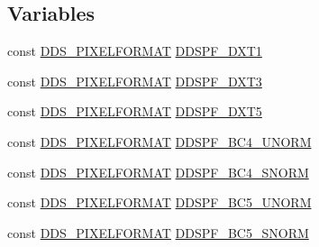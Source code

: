 \subsection*{Variables}
\begin{DoxyCompactItemize}
\item 
const \mbox{\hyperlink{structanonymous__namespace_02screen__grab_8cpp_03_1_1_d_d_s___p_i_x_e_l_f_o_r_m_a_t}{D\+D\+S\+\_\+\+P\+I\+X\+E\+L\+F\+O\+R\+M\+AT}} \mbox{\hyperlink{namespaceanonymous__namespace_02screen__grab_8cpp_03_a52971a3b32f88a41ba10319209620f61}{D\+D\+S\+P\+F\+\_\+\+D\+X\+T1}}
\item 
const \mbox{\hyperlink{structanonymous__namespace_02screen__grab_8cpp_03_1_1_d_d_s___p_i_x_e_l_f_o_r_m_a_t}{D\+D\+S\+\_\+\+P\+I\+X\+E\+L\+F\+O\+R\+M\+AT}} \mbox{\hyperlink{namespaceanonymous__namespace_02screen__grab_8cpp_03_af65ddd1a80c5c9866e9d8171398ea4f8}{D\+D\+S\+P\+F\+\_\+\+D\+X\+T3}}
\item 
const \mbox{\hyperlink{structanonymous__namespace_02screen__grab_8cpp_03_1_1_d_d_s___p_i_x_e_l_f_o_r_m_a_t}{D\+D\+S\+\_\+\+P\+I\+X\+E\+L\+F\+O\+R\+M\+AT}} \mbox{\hyperlink{namespaceanonymous__namespace_02screen__grab_8cpp_03_a1b58f7e3063382cc1dff94cae1e5dca8}{D\+D\+S\+P\+F\+\_\+\+D\+X\+T5}}
\item 
const \mbox{\hyperlink{structanonymous__namespace_02screen__grab_8cpp_03_1_1_d_d_s___p_i_x_e_l_f_o_r_m_a_t}{D\+D\+S\+\_\+\+P\+I\+X\+E\+L\+F\+O\+R\+M\+AT}} \mbox{\hyperlink{namespaceanonymous__namespace_02screen__grab_8cpp_03_aa9a1896ce90ebd69041a9afe88bb5435}{D\+D\+S\+P\+F\+\_\+\+B\+C4\+\_\+\+U\+N\+O\+RM}}
\item 
const \mbox{\hyperlink{structanonymous__namespace_02screen__grab_8cpp_03_1_1_d_d_s___p_i_x_e_l_f_o_r_m_a_t}{D\+D\+S\+\_\+\+P\+I\+X\+E\+L\+F\+O\+R\+M\+AT}} \mbox{\hyperlink{namespaceanonymous__namespace_02screen__grab_8cpp_03_a221eebdb77a1a0797d75017072fa8dc1}{D\+D\+S\+P\+F\+\_\+\+B\+C4\+\_\+\+S\+N\+O\+RM}}
\item 
const \mbox{\hyperlink{structanonymous__namespace_02screen__grab_8cpp_03_1_1_d_d_s___p_i_x_e_l_f_o_r_m_a_t}{D\+D\+S\+\_\+\+P\+I\+X\+E\+L\+F\+O\+R\+M\+AT}} \mbox{\hyperlink{namespaceanonymous__namespace_02screen__grab_8cpp_03_a2dc57874babf0451c5942feb40cb8a6e}{D\+D\+S\+P\+F\+\_\+\+B\+C5\+\_\+\+U\+N\+O\+RM}}
\item 
const \mbox{\hyperlink{structanonymous__namespace_02screen__grab_8cpp_03_1_1_d_d_s___p_i_x_e_l_f_o_r_m_a_t}{D\+D\+S\+\_\+\+P\+I\+X\+E\+L\+F\+O\+R\+M\+AT}} \mbox{\hyperlink{namespaceanonymous__namespace_02screen__grab_8cpp_03_a4c0fe1d61542bbe71717cdb509cf5d97}{D\+D\+S\+P\+F\+\_\+\+B\+C5\+\_\+\+S\+N\+O\+RM}}

\end{DoxyCompactItemize}
